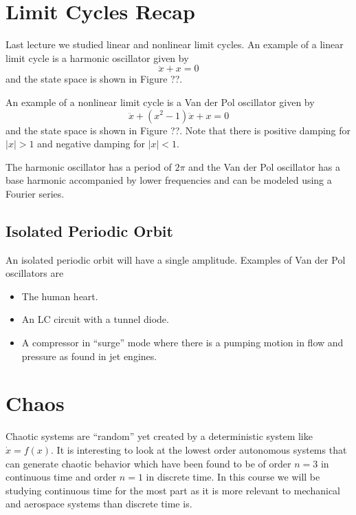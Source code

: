 
\mainmatter
\setcounter{page}{1}

\lectureseries[\course]{\course}

\date{January 7, 2010}

\setaddress

\setcounter{lecture}{1}
\setcounter{chapter}{1}


\section{Limit Cycles Recap}
Last lecture we studied linear and nonlinear limit cycles. An example of a linear limit cycle is a  harmonic oscillator given by
$$\ddot{x} + x = 0$$
and the state space is shown in Figure ??.

An example of a nonlinear limit cycle is a Van der Pol oscillator given by
$$\ddot{x} + (x^2-1)\ddot{x} + x = 0$$
and the state space is shown in Figure ??. Note that there is positive damping for $|x|>1$ and negative damping for $|x|<1$.

The harmonic oscillator has a period of $2\pi$ and the Van der Pol oscillator has a base harmonic accompanied by lower frequencies and can be modeled using a Fourier series.

\subsection{Isolated Periodic Orbit}
An isolated periodic orbit will have a single amplitude. Examples of Van der Pol oscillators are
\begin{itemize}
\item The human heart.
\item An LC circuit with a tunnel diode.
\item A compressor in ``surge'' mode where there is a pumping motion in flow and pressure as found in jet engines.
\end{itemize}

\section{Chaos}
Chaotic systems are ``random'' yet created by a deterministic system like $\dot{x}=f(x)$. It is interesting to look at the lowest order autonomous systems that can generate chaotic behavior which have been found to be of order $n=3$ in continuous time and order $n=1$ in discrete time. In this course we will be studying continuous time for the most part as it is more relevant to mechanical and aerospace systems than discrete time is.

